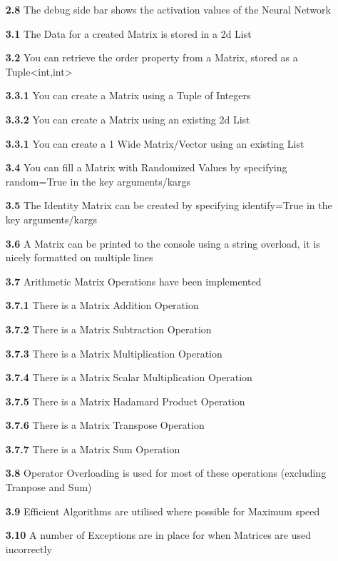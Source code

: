 \begin{flushleft}
\begin{itemize}
            \item[\textbf{2.8}] The debug side bar shows the activation values of the Neural Network
            \item[\textbf{3.1}] The Data for a created Matrix is stored in a 2d List
            \item[\textbf{3.2}] You can retrieve the \textsf{order} property from a Matrix, stored as a Tuple<int,int>
            \item[\textbf{3.3.1}] You can create a Matrix using a Tuple of Integers
            \item[\textbf{3.3.2}] You can create a Matrix using an existing 2d List
            \item[\textbf{3.3.1}] You can create a 1 Wide Matrix/Vector using an existing List
            \item[\textbf{3.4}] You can fill a Matrix with Randomized Values by specifying \textsf{random=True} in the key arguments/kargs 
            \item[\textbf{3.5}] The Identity Matrix can be created by specifying \textsf{identify=True} in the key arguments/kargs 
            \item[\textbf{3.6}] A Matrix can be printed to the console using a string overload, it is nicely formatted on multiple lines
            \item[\textbf{3.7}] Arithmetic Matrix Operations have been implemented
            \item[\textbf{3.7.1}] There is a Matrix Addition Operation
            \item[\textbf{3.7.2}] There is a Matrix Subtraction Operation
            \item[\textbf{3.7.3}] There is a Matrix Multiplication Operation
            \item[\textbf{3.7.4}] There is a Matrix Scalar Multiplication Operation
            \item[\textbf{3.7.5}] There is a Matrix Hadamard Product Operation
            \item[\textbf{3.7.6}] There is a Matrix Transpose Operation
            \item[\textbf{3.7.7}] There is a Matrix Sum Operation
            \item[\textbf{3.8}] Operator Overloading is used for most of these operations (excluding Tranpose and Sum)
            \item[\textbf{3.9}] Efficient Algorithms are utilised where possible for Maximum speed
            \item[\textbf{3.10}] A number of Exceptions are in place for when Matrices are used incorrectly

\end{itemize}
\end{flushleft}

